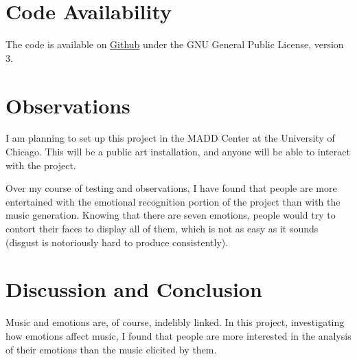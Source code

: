 \documentclass{article}
\renewcommand{\_}[1]{\underline{ #1 }}
\theoremstyle{definition}
\begin{document}
\section[Code Availability]{Code Availability}

The code is available on \href{https://github.com/as4mo3/face-the-music/}{Github} under the GNU General Public License, version 3. 

\section[Observations]{Observations}
\label{Observations}

I am planning to set up this project in the MADD Center at the University of Chicago. This will be a public art installation, and anyone will be able to interact with the project. 

Over my course of testing and observations, I have found that people are more entertained with the emotional recognition portion of the project than with the music generation. Knowing that there are seven emotions, people would try to contort their faces to display all of them, which is not as easy as it sounds (disgust is notoriously hard to produce consistently). 

\section[Discussion and Conclusion]{Discussion and Conclusion}
\label{Discussion and Conclusion}

Music and emotions are, of course, indelibly linked. In this project, investigating how emotions affect music, I found that people are more interested in the analysis of their emotions than the music elicited by them.



\cleardoublepage
\ifdefined{}
\else
\fi

% 
\nocite{*} %
\printbibliography



\end{document}
